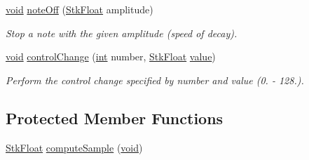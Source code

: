 \begin{DoxyCompactItemize}
\hyperlink{sound_8c_ae35f5844602719cf66324f4de2a658b3}{void} \hyperlink{class_nyq_1_1_flute_a7cd60f77acbb3c44032ca3554db5c7c9}{note\+Off} (\hyperlink{namespace_nyq_a044fa20a706520a617bbbf458a7db7e4}{Stk\+Float} amplitude)
\begin{DoxyCompactList}\small\item\em Stop a note with the given amplitude (speed of decay). \end{DoxyCompactList}\item 
\hyperlink{sound_8c_ae35f5844602719cf66324f4de2a658b3}{void} \hyperlink{class_nyq_1_1_flute_ad7c993aefcc82f884f5783d4d5ad58d0}{control\+Change} (\hyperlink{xmltok_8h_a5a0d4a5641ce434f1d23533f2b2e6653}{int} number, \hyperlink{namespace_nyq_a044fa20a706520a617bbbf458a7db7e4}{Stk\+Float} \hyperlink{lib_2expat_8h_a4a30a13b813682e68c5b689b45c65971}{value})
\begin{DoxyCompactList}\small\item\em Perform the control change specified by {\itshape number} and {\itshape value} (0. -\/ 128.). \end{DoxyCompactList}\end{DoxyCompactItemize}
\subsection*{Protected Member Functions}
\begin{DoxyCompactItemize}
\item 
\hyperlink{namespace_nyq_a044fa20a706520a617bbbf458a7db7e4}{Stk\+Float} \hyperlink{class_nyq_1_1_flute_a486bad49fc1a34bd9af8487efc3be4c4}{compute\+Sample} (\hyperlink{sound_8c_ae35f5844602719cf66324f4de2a658b3}{void})
\end{DoxyCompactItemize}
